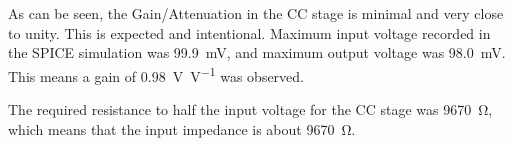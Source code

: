 \documentclass[12pt]{article}
\begin{document}
As can be seen, the Gain/Attenuation in the CC stage is minimal and very close to unity. This is expected and intentional. Maximum input voltage recorded in the SPICE simulation was \SI{99.9}{\milli\volt}, and maximum output voltage was \SI{98.0}{\milli\volt}. This means a gain of \SI[per-mode=symbol]{0.98}{\volt\per\volt} was observed.

\begin{figure}[H]
    \centering
\end{figure}

The required resistance to half the input voltage for the CC stage was \SI{9670}{\ohm}, which means that the input impedance is about \SI{9670}{\ohm}.
\end{document}
